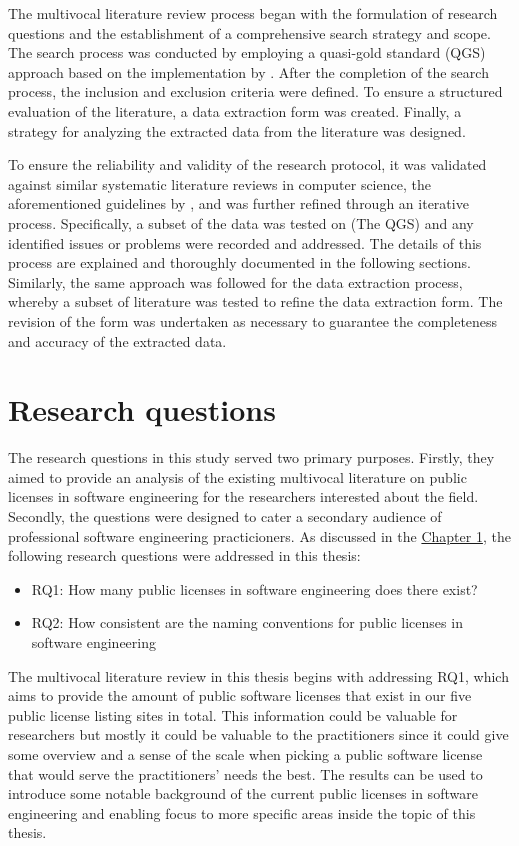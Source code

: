 The multivocal literature review process began with the formulation of research questions and the establishment of a comprehensive search strategy and scope. The search process was conducted by employing a quasi-gold standard (QGS) approach based on the implementation by \cite{qgs}. After the completion of the search process, the inclusion and exclusion criteria were defined. To ensure a structured evaluation of the literature, a data extraction form was created. Finally, a strategy for analyzing the extracted data from the literature was designed.

 To ensure the reliability and validity of the research protocol, it was validated against similar systematic literature reviews in computer science, the aforementioned guidelines by \cite{kitchenham2007}, and was further refined through an iterative process. Specifically, a subset of the data was tested on (The QGS) and any identified issues or problems were recorded and addressed. The details of this process are explained and thoroughly documented in the following sections. Similarly, the same approach was followed for the data extraction process, whereby a subset of literature was tested to refine the data extraction form. The revision of the form was undertaken as necessary to guarantee the completeness and accuracy of the extracted data.

 \section{Research questions}\label{rqs}
The research questions in this study served two primary purposes. Firstly, they aimed to provide an analysis of the existing multivocal literature on public licenses in software engineering for the researchers interested about the field. Secondly, the questions were designed to cater a secondary audience of professional software engineering practicioners. As discussed in the \hyperref[intro]{Chapter 1}, the following research questions were addressed in this thesis:

\begin{itemize}
  \item RQ1: How many public licenses in software engineering does there exist?
  \item RQ2: How consistent are the naming conventions for public licenses in software engineering
\end{itemize}

The multivocal literature review in this thesis begins with addressing RQ1, which aims to provide the amount of public software licenses that exist in our five public license listing sites in total. This information could be valuable for researchers but mostly it could be valuable to the practitioners since it could give some overview and a sense of the scale when picking a public software license that would serve the practitioners' needs the best. The results can be used to introduce some notable background of the current public licenses in software engineering and enabling focus to more specific areas inside the topic of this thesis.

